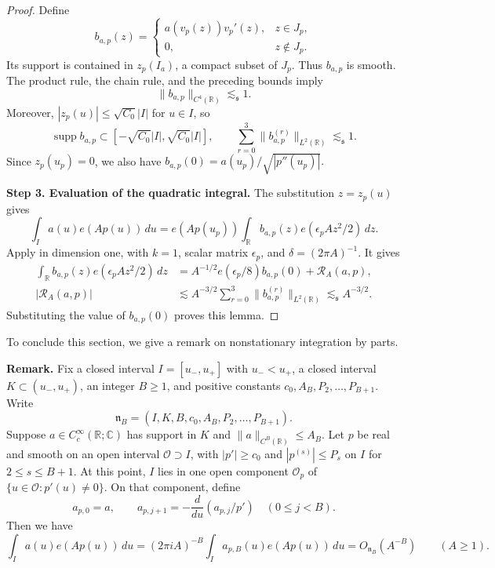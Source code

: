 \documentclass[reqno,12pt]{amsart}
\def \C {\mathbb C}
\def \R {\mathbb R}
\numberwithin{equation}{section}
\begin{document}
\begin{proof}
	Define
	\[
	b_{a,p}(z)=
	\begin{cases}
	a(v_p(z))v_p'(z),&z\in J_p,\\
	0,&z\notin J_p.
	\end{cases}
	\]
	Its support is contained in $z_p(I_a)$, a compact subset of
	$J_p$. Thus $b_{a,p}$ is smooth. The product rule,
	the chain rule, and the preceding bounds imply
	\[
	\|b_{a,p}\|_{C^4(\R)}\lesssim_{\mathfrak s} 1.
	\]
	Moreover, $|z_p(u)|\le\sqrt{C_0}|I|$ for $u\in I$, so
	\[
	\operatorname{supp}b_{a,p}
	\subset[-\sqrt{C_0}|I|,\sqrt{C_0}|I|],
	\qquad
	\sum_{r=0}^{3}\|b_{a,p}^{(r)}\|_{L^2(\R)}
	\lesssim_{\mathfrak s} 1.
	\]
	Since $z_p(u_p)=0$, we also have
	$
	b_{a,p}(0)={a(u_p)}/{\sqrt{|p''(u_p)|}}.
	$
	
	\medskip
	\noindent\textbf{Step 3. Evaluation of the quadratic integral.}
	The substitution $z=z_p(u)$ gives
	\[
	\int_I a(u)e(Ap(u))\,du
	=
	e(Ap(u_p))
	\int_\R b_{a,p}(z)e(\epsilon_p A z^2/2)\,dz.
	\]
	Apply \cite[Theorem~2.2]{Blair2022} in
	dimension one, with $k=1$, scalar matrix
	$\epsilon_p$, and $\delta=(2\pi A)^{-1}$. It gives
	\[
	\begin{aligned}
	\int_\R b_{a,p}(z)e(\epsilon_p A z^2/2)\,dz
	&=A^{-1/2}e(\epsilon_p/8)b_{a,p}(0)
	+\mathcal R_A(a,p),\\
	|\mathcal R_A(a,p)|
	&\lesssim A^{-3/2}
	\sum_{r=0}^{3}\|b_{a,p}^{(r)}\|_{L^2(\R)}
	\lesssim_{\mathfrak s}A^{-3/2}.
	\end{aligned}
	\]
	Substituting the value of $b_{a,p}(0)$ proves this lemma.
\end{proof}
To conclude this section, we give a remark on nonstationary integration by parts.

\medskip
\noindent\textbf{Remark.}
Fix a closed interval $I=[u_-,u_+]$ with $u_-<u_+$, a closed
interval $K\subset(u_-,u_+)$, an integer $B\ge1$, and positive
constants $c_0,A_B,P_2,\ldots,P_{B+1}$. Write
$$
 \mathfrak n_B=(I,K,B,c_0,A_B,P_2,\ldots,P_{B+1}).
$$
Suppose $a\in C_c^\infty(\R;\C)$ has support in $K$ and
$\|a\|_{C^B(\R)}\le A_B$. Let $p$ be real and smooth on an
open interval $\mathcal O\supset I$, with
$|p'|\ge c_0$ and $|p^{(s)}|\le P_s$ on $I$ for
$2\le s\le B+1$. At this point, $I$ lies in one open component $\mathcal O_p$
of $\{u\in\mathcal O:p'(u)\ne0\}$.
On that component, define
\[
a_{p,0}=a,\qquad a_{p,j+1}
=-\frac d{du}(a_{p,j}/p')\quad(0\le j<B).
\]
Then we have
\begin{equation}
 \int_Ia(u)e(Ap(u))\,du
 =(2\pi iA)^{-B}\int_Ia_{p,B}(u)e(Ap(u))\,du
 =O_{\mathfrak n_B}(A^{-B})\qquad(A\ge1).
 \label{eq3-add-nonstationary}
\end{equation}
\end{document}

